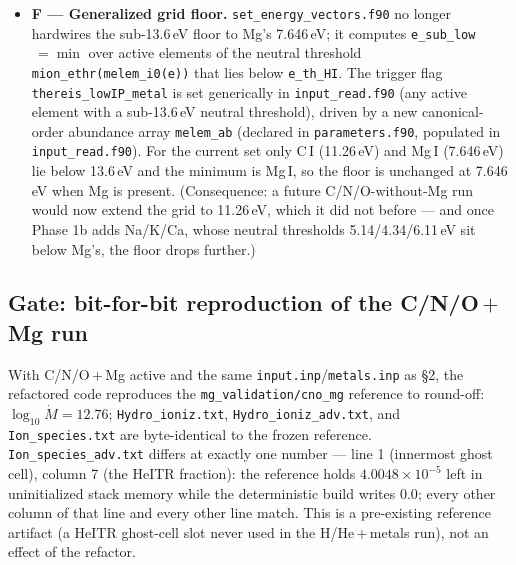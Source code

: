 \documentclass[english,a4paper]{kiseon_memo}
\begin{document}
{\begin{itemize}
  equations each, force-zeroing absent elements). \verb|params| now carries only
  H/He (1--11), HeITR (12--18), and the C/N/O charge-transfer rates (40--48); the
  old per-element slots 49--55 are gone. The driver builds metal densities,
  initial guesses, and the solution unpack by looping over
  \verb|n_melem|/\verb|n_mion|. The system size is now the formula
  \verb|N_eq = 3 + 2*n_melem| ($=11$ for the current four elements), set in
  \verb|input_read.f90|.
\item \textbf{F --- Generalized grid floor.} \verb|set_energy_vectors.f90| no
  longer hardwires the sub-13.6\,eV floor to Mg's 7.646\,eV; it computes
  \verb|e_sub_low|$\,=\min$ over active elements of the neutral threshold
  \verb|mion_ethr(melem_i0(e))| that lies below \verb|e_th_HI|. The trigger flag
  \verb|thereis_lowIP_metal| is set generically in \verb|input_read.f90| (any
  active element with a sub-13.6\,eV neutral threshold), driven by a new
  canonical-order abundance array \verb|melem_ab| (declared in
  \verb|parameters.f90|, populated in \verb|input_read.f90|). For the current set
  only C\,I (11.26\,eV) and Mg\,I (7.646\,eV) lie below 13.6\,eV and the minimum
  is Mg\,I, so the floor is unchanged at 7.646\,eV when Mg is present.
  (Consequence: a future C/N/O-without-Mg run would now extend the grid to
  11.26\,eV, which it did not before --- and once Phase 1b adds Na/K/Ca, whose
  neutral thresholds 5.14/4.34/6.11\,eV sit below Mg's, the floor drops further.)
\end{itemize}
}

\subsection{Gate: bit-for-bit reproduction of the C/N/O\,$+$\,Mg run}

With C/N/O\,$+$\,Mg active and the same \texttt{input.inp}/\texttt{metals.inp} as
\S2, the refactored code reproduces the \texttt{mg\_validation/cno\_mg} reference
to round-off: $\log_{10}\dot M = 12.76$; \texttt{Hydro\_ioniz.txt},
\texttt{Hydro\_ioniz\_adv.txt}, and \texttt{Ion\_species.txt} are byte-identical
to the frozen reference. \texttt{Ion\_species\_adv.txt} differs at exactly one
number --- line 1 (innermost ghost cell), column 7 (the HeITR fraction): the
reference holds $4.0048\times10^{-5}$ left in uninitialized stack memory while the
deterministic build writes $0.0$; every other column of that line and every other
line match. This is a pre-existing reference artifact (a HeITR ghost-cell slot
never used in the H/He\,$+$\,metals run), not an effect of the refactor.
\end{document}
